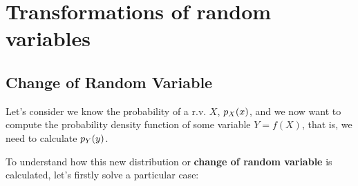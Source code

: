 %
%
%

\appendix
\chapter{Transformations of random variables}
\label{introA} %

\section{Change of Random Variable}
\label{sec:1}

Let's consider we know the probability of a r.v. $X$, $p_X(x)$, and we now want to compute the probability density function of some variable $Y=f(X)$, that is, we need to calculate $p_Y(y)$.

To understand how this new distribution or {\bf change of random variable} is calculated, let's firstly solve a particular case:

